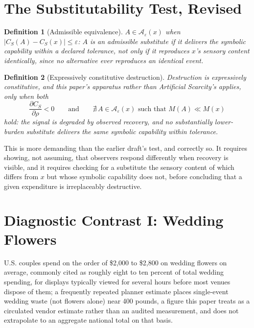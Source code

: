 \documentclass[11pt]{article}
\newtheorem{definition}{Definition}[section]
\begin{document}
\section{The Substitutability Test, Revised}

\begin{definition}[Admissible equivalence]
$A \in \mathcal{A}_\varepsilon(x)$ when $|C_S(A) - C_S(x)| \leq \varepsilon$: $A$ is an admissible substitute if it delivers the symbolic capability within a declared tolerance, not only if it reproduces $x$'s sensory content identically, since no alternative ever reproduces an identical event.
\end{definition}

\begin{definition}[Expressively constitutive destruction]
Destruction is expressively constitutive, and this paper's apparatus rather than \emph{Artificial Scarcity}'s applies, only when both
\[
\frac{\partial C_S}{\partial \rho} < 0 \qquad \text{and} \qquad \nexists\, A \in \mathcal{A}_\varepsilon(x) \text{ such that } M(A) \ll M(x)
\]
hold: the signal is degraded by observed recovery, and no substantially lower-burden substitute delivers the same symbolic capability within tolerance.
\end{definition}

This is more demanding than the earlier draft's test, and correctly so. It requires showing, not assuming, that observers respond differently when recovery is visible, and it requires checking for a substitute the sensory content of which differs from $x$ but whose symbolic capability does not, before concluding that a given expenditure is irreplaceably destructive.

\section{Diagnostic Contrast I: Wedding Flowers}

U.S. couples spend on the order of \$2{,}000 to \$2{,}800 on wedding flowers on average, commonly cited as roughly eight to ten percent of total wedding spending, for displays typically viewed for several hours before most venues dispose of them; a frequently repeated planner estimate places single-event wedding waste (not flowers alone) near 400 pounds, a figure this paper treats as a circulated vendor estimate rather than an audited measurement, and does not extrapolate to an aggregate national total on that basis.
\end{document}
